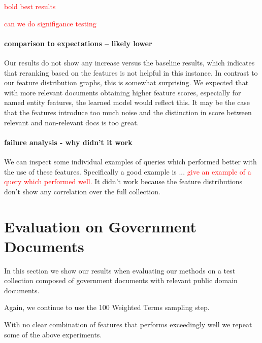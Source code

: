 \documentclass{mpaper}
\newcommand{\remove}[1]{\textcolor{red}{#1}}
\begin{document}
\remove{bold best results}

\remove{can we do signifigance testing}

\paragraph{comparison to expectations -- likely lower}
Our results do not show any increase versus the baseline results, which indicates that reranking based on the features is not helpful in this instance.
In contrast to our feature distribution graphs, this is somewhat surprising. We expected that with more relevant documents obtaining higher feature scores, especially for named entity features, the learned model would reflect this.
It may be the case that the features introduce too much noise and the distinction in score between relevant and non-relevant docs is too great.

\paragraph{failure analysis - why didn't it work}
We can inspect some individual examples of queries which performed better with the use of these features.
Specifically a good example is ... \remove{give an example of a query which performed well.}
It didn't work because the feature distributions don't show any correlation over the full collection.



\section{Evaluation on Government Documents} \label{sec:RQ3}
In this section we show our results when evaluating our methods on a test collection composed of government documents with relevant public domain documents.

Again, we continue to use the 100 Weighted Terms sampling step.

With no clear combination of features that performs exceedingly well we repeat some of the above experiments.
\end{document}

